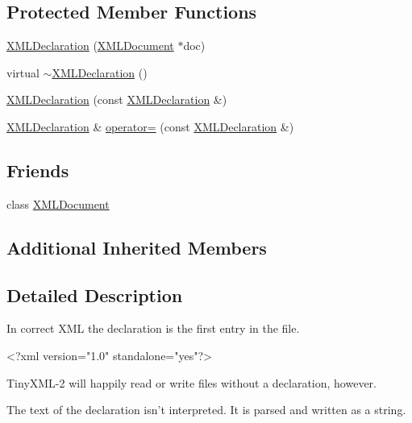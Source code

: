 \subsection*{Protected Member Functions}
\begin{DoxyCompactItemize}
\item 
\hyperlink{classtinyxml2_1_1_x_m_l_declaration_aef9586f2ce5df5feba74dde49a242b06}{X\+M\+L\+Declaration} (\hyperlink{classtinyxml2_1_1_x_m_l_document}{X\+M\+L\+Document} $\ast$doc)
\item 
virtual \hyperlink{classtinyxml2_1_1_x_m_l_declaration_ab93d5bf4f5d58b4144963cf739cf6dcc}{$\sim$\+X\+M\+L\+Declaration} ()
\item 
\hyperlink{classtinyxml2_1_1_x_m_l_declaration_a5229cc0b31f034f93289af27ec3e2836}{X\+M\+L\+Declaration} (const \hyperlink{classtinyxml2_1_1_x_m_l_declaration}{X\+M\+L\+Declaration} \&)
\item 
\hyperlink{classtinyxml2_1_1_x_m_l_declaration}{X\+M\+L\+Declaration} \& \hyperlink{classtinyxml2_1_1_x_m_l_declaration_a79eb518c2c2b1b99a122a5d5a308b7ee}{operator=} (const \hyperlink{classtinyxml2_1_1_x_m_l_declaration}{X\+M\+L\+Declaration} \&)
\end{DoxyCompactItemize}
\subsection*{Friends}
\begin{DoxyCompactItemize}
\item 
class \hyperlink{classtinyxml2_1_1_x_m_l_declaration_a4eee3bda60c60a30e4e8cd4ea91c4c6e}{X\+M\+L\+Document}
\end{DoxyCompactItemize}
\subsection*{Additional Inherited Members}


\subsection{Detailed Description}
In correct X\+M\+L the declaration is the first entry in the file. \begin{DoxyVerb}    <?xml version="1.0" standalone="yes"?>
\end{DoxyVerb}


Tiny\+X\+M\+L-\/2 will happily read or write files without a declaration, however.

The text of the declaration isn't interpreted. It is parsed and written as a string. 

